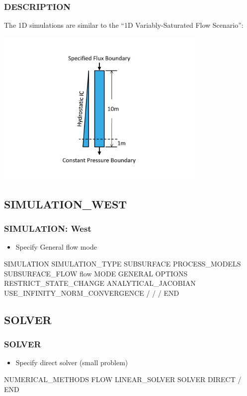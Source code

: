 \documentclass{beamer}
\begin{document}
\begin{frame}[fragile]\frametitle{DESCRIPTION}

The 1D simulations are similar to the ``1D Variably-Saturated Flow Scenario'':

\includegraphics[height=3in]{../../1D_variably_saturated_flow/doc/vsat_flow_uniform.pdf}

\end{frame}

\subsection{SIMULATION\_WEST}

\begin{frame}[fragile]\frametitle{SIMULATION: West}

\begin{itemize}
\item Specify General flow mode
\end{itemize}


\begin{semiverbatim}

SIMULATION
  SIMULATION_TYPE SUBSURFACE
  PROCESS_MODELS
    SUBSURFACE_FLOW flow
      MODE GENERAL
      OPTIONS
        RESTRICT_STATE_CHANGE
        ANALYTICAL_JACOBIAN
        USE_INFINITY_NORM_CONVERGENCE
      /
    /
  /
END
\end{semiverbatim}

\end{frame}

\subsection{SOLVER}
\begin{frame}[fragile]\frametitle{SOLVER}

\begin{itemize}
  \item Specify direct solver (small problem)
\end{itemize}

\begin{semiverbatim}
NUMERICAL_METHODS FLOW
  LINEAR_SOLVER
    SOLVER DIRECT
  /
END
\end{semiverbatim}
\end{frame}
\end{document}
